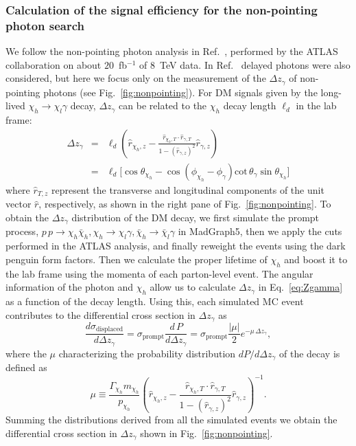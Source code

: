 \subsubsection{Calculation of the signal efficiency for the non-pointing photon search}
%
We follow the non-pointing photon analysis in Ref.~\cite{Aad:2014gfa}, performed
by the ATLAS collaboration on about $20$~fb$^{-1}$ of $8$~TeV data. In
Ref.~\cite{Aad:2014gfa} delayed photons were also considered, but here we focus
only on the measurement of the $\Delta z_{\gamma}$ of non-pointing photons (see
Fig.~\ref{fig:nonpointing}). For DM signals given by the long-lived
$\chi_h\to\chi_l\gamma$ decay, $\Delta z_{\gamma}$ can be related to the
$\chi_h$ decay length $\ell_{d}$ in the lab frame:
\begin{eqnarray}\label{eq:Zgamma}
\Delta z_{\gamma}&=&\ell_d\left(\hat{r}_{\chi_h,z}-\frac{\hat{r}_{\chi_h,T}\cdot\hat{r}_{\gamma,T}}{1-(\hat{r}_{\gamma,z})^2}\hat{r}_{\gamma,z}\right)\nonumber\\
& =& \ell_d \Big[\cos\theta_{\chi_h} -\cos (\phi_{\chi_h} - \phi_\gamma)\mathrm{cot}\,\theta_\gamma \sin \theta_{\chi_h} \Big]
\end{eqnarray}
where $\hat{r}_{T,z}$ represent the transverse and longitudinal components of
the unit vector $\hat{r}$, respectively, as shown in
the right pane of Fig.~\ref{fig:nonpointing}.
To obtain the $\Delta z_{\gamma}$ distribution of the DM decay, we first
simulate the prompt process, $p\,p \to \chi_h\bar{\chi}_h,
\chi_h\to\chi_l\gamma, \bar{\chi}_h\to\bar{\chi}_l\gamma$ in MadGraph5, then we
apply the cuts performed in the ATLAS analysis, and finally reweight the events
using the dark penguin form factors. Then we calculate the proper lifetime of
$\chi_h$ and boost it to the lab frame using the momenta of each parton-level
event. The angular information of the photon and $\chi_h$ allow us to calculate
$\Delta z_{\gamma}$ in Eq.~\eqref{eq:Zgamma} as a function of the decay length.
Using this, each simulated MC event contributes to the differential cross
section in $\Delta z_{\gamma}$ as
\begin{equation} \label{eq:displdistr}
\frac{d\sigma_{\text{displaced}}}{d\Delta z_{\gamma}} =\sigma_{\text{prompt}}\frac{d\,P}{d\Delta z_{\gamma}}=\sigma_{\text{prompt}}\frac{|\mu|}{2} e^{-\mu\,\Delta z_{\gamma}},
\end{equation}
where the $\mu$ characterizing the probability distribution $dP/d\Delta z_\gamma$ of the decay is defined as
\begin{equation}
\mu\equiv\frac{\Gamma_{\chi_h}m_{\chi_h}}{p_{\chi_h}}\left(\hat{r}_{\chi_h,z}-\frac{\hat{r}_{\chi_h,T}\cdot\hat{r}_{\gamma,T}}{1-(\hat{r}_{\gamma,z})^2}\hat{r}_{\gamma,z}\right)^{-1}.
\end{equation}
Summing the distributions derived from all the simulated events we obtain the
differential cross section in $\Delta z_\gamma$ shown in Fig.~\ref{fig:nonpointing}.

